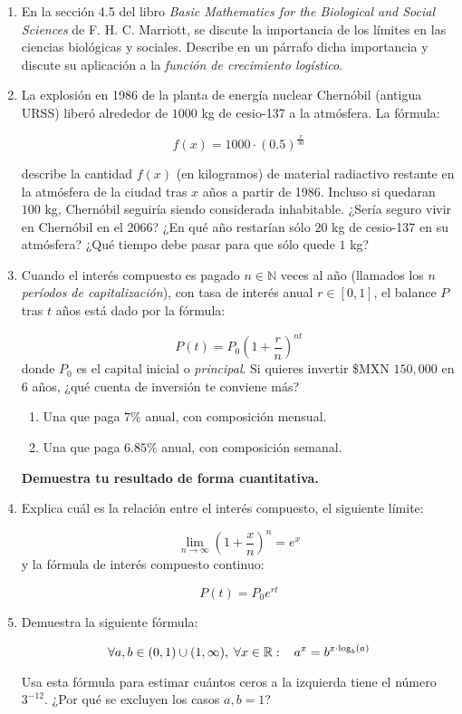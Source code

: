\documentclass[10pt,a4paper]{article}
\begin{document}
\begin{enumerate}
		\item En la sección 4.5 del libro  \textit{Basic Mathematics for the Biological and Social Sciences} de F. H. C. Marriott, se discute la importancia de los límites en las ciencias biológicas y sociales. Describe en un párrafo dicha importancia y discute su aplicación a la \textit{función de crecimiento logístico}.
	
		\item La explosión en 1986 de la planta de energía nuclear Chernóbil (antigua URSS) liberó alrededor de $1000$ kg de cesio-137 a la atmósfera. La fórmula:
		
			\[ f(x)=1000 \cdot (0.5)^{\frac{x}{30}} \]
	
describe la cantidad $f(x)$ (en kilogramos) de material radiactivo restante en la atmósfera de la ciudad tras $x$ años a partir de 1986. Incluso si quedaran $100$ kg, Chernóbil seguiría siendo considerada inhabitable. ¿Sería seguro vivir en Chernóbil en el 2066? ¿En qué año restarían sólo $20$ kg de cesio-137 en su atmósfera? ¿Qué tiempo debe pasar para que sólo quede $1$ kg?

		\item Cuando el interés compuesto es pagado $n\in\mathbb{N}$ veces al año (llamados los $n$ \textit{períodos de capitalización}), con tasa de interés anual $r\in[0,1]$, el balance $P$ tras $t$ años está dado por la fórmula:
		
			\[P(t)=P_0 \left( 1+\frac{r}{n} \right)^{nt}\]
donde $P_0$ es el capital inicial o \textit{principal}.
	Si quieres invertir \$MXN $150,000$ en 6 años, ¿qué cuenta de inversión te conviene más? 
		\begin{enumerate}
			\item Una que paga $7\%$ anual, con composición mensual.
			\item Una que paga $6.85\%$ anual, con composición semanal.
		\end{enumerate}
\textbf{Demuestra tu resultado de forma cuantitativa.}
		
		\item Explica cuál es la relación entre el interés compuesto, el siguiente límite:
		
			\[\lim_{n\to\infty} \left( 1+\frac{x}{n} \right)^n=e^x\]
y la fórmula de interés compuesto continuo:
			
			\[P(t)=P_0 e^{rt}\]
			
		\item Demuestra la siguiente fórmula:
		
			\[\forall a,b\in\left(0,1\right)\cup(1,\infty), \; \forall x\in\mathbb{R}:\hspace{3mm} a^x=b^{x\cdot\log_{b}(a)}\]

Usa esta fórmula para estimar cuántos ceros a la izquierda tiene el número $3^{-12}$. ¿Por qué se excluyen los casos $a,b=1$?

	\end{enumerate}
\end{document}
